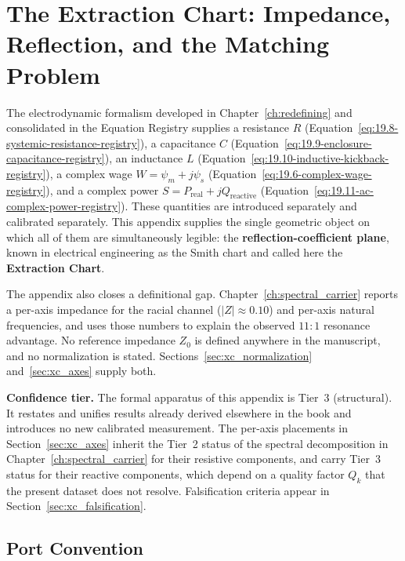 \chapter{The Extraction Chart: Impedance, Reflection, and the Matching Problem}
\label{apx:extraction_chart}

The electrodynamic formalism developed in Chapter~\ref{ch:redefining} and consolidated in the
Equation Registry supplies a resistance $R$ (Equation~\ref{eq:19.8-systemic-resistance-registry}),
a capacitance $C$ (Equation~\ref{eq:19.9-enclosure-capacitance-registry}), an inductance $L$
(Equation~\ref{eq:19.10-inductive-kickback-registry}), a complex wage
$W = \psi_m + j\psi_s$ (Equation~\ref{eq:19.6-complex-wage-registry}), and a complex power
$S = P_{\text{real}} + jQ_{\text{reactive}}$ (Equation~\ref{eq:19.11-ac-complex-power-registry}).
These quantities are introduced separately and calibrated separately. This appendix supplies the
single geometric object on which all of them are simultaneously legible: the
\textbf{reflection-coefficient plane}, known in electrical engineering as the Smith chart and
called here the \textbf{Extraction Chart}.

The appendix also closes a definitional gap. Chapter~\ref{ch:spectral_carrier} reports a per-axis
impedance for the racial channel ($|Z| \approx 0.10$) and per-axis natural frequencies, and uses
those numbers to explain the observed $11{:}1$ resonance advantage. No reference impedance $Z_0$ is
defined anywhere in the manuscript, and no normalization is stated. Sections~\ref{sec:xc_normalization}
and~\ref{sec:xc_axes} supply both.

\medskip

\noindent\textbf{Confidence tier.} The formal apparatus of this appendix is Tier~3
(structural). It restates and unifies results already derived elsewhere in the book and introduces
no new calibrated measurement. The per-axis placements in Section~\ref{sec:xc_axes} inherit the
Tier~2 status of the spectral decomposition in Chapter~\ref{ch:spectral_carrier} for their
resistive components, and carry Tier~3 status for their reactive components, which depend on a
quality factor $Q_k$ that the present dataset does not resolve. Falsification criteria appear in
Section~\ref{sec:xc_falsification}.

\section{Port Convention}
\label{sec:xc_ports}

